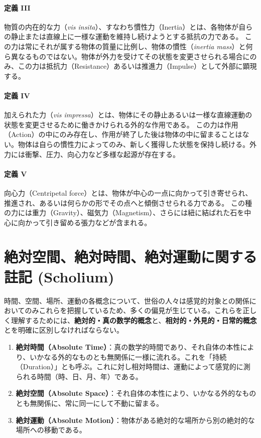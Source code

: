 \documentclass[a4paper,11pt,oneside,openany]{ltjsbook}
\begin{document}
\paragraph{定義 III}
物質の内在的な力（\textit{vis insita}）、すなわち慣性力（Inertia）とは、各物体が自らの静止または直線上に一様な運動を維持し続けようとする抵抗の力である。
この力は常にそれが属する物体の質量に比例し、物体の慣性（\textit{inertia mass}）と何ら異なるものではない。物体が外力を受けてその状態を変更させられる場合にのみ、この力は抵抗力（Resistance）あるいは推進力（Impulse）として外部に顕現する。

\paragraph{定義 IV}
加えられた力（\textit{vis impressa}）とは、物体にその静止あるいは一様な直線運動の状態を変更させるために働きかけられる外的な作用である。
この力は作用（Action）の中にのみ存在し、作用が終了した後は物体の中に留まることはない。物体は自らの慣性力によってのみ、新しく獲得した状態を保持し続ける。外力には衝撃、圧力、向心力など多様な起源が存在する。

\paragraph{定義 V}
向心力（Centripetal force）とは、物体が中心の一点に向かって引き寄せられ、推進され、あるいは何らかの形でその点へと傾倒させられる力である。
この種の力には重力（Gravity）、磁気力（Magnetism）、さらには紐に結ばれた石を中心に向かって引き留める張力などが含まれる。

\section{絶対空間、絶対時間、絶対運動に関する註記 (Scholium)}

時間、空間、場所、運動の各概念について、世俗の人々は感覚的対象との関係においてのみこれらを把握しているため、多くの偏見が生じている。これらを正しく理解するためには、\textbf{絶対的・真の数学的概念}と、\textbf{相対的・外見的・日常的概念}とを明確に区別しなければならない。

\begin{enumerate}
    \item \textbf{絶対時間（Absolute Time）}：真の数学的時間であり、それ自体の本性により、いかなる外的なものとも無関係に一様に流れる。これを「持続（Duration）」とも呼ぶ。これに対し相対時間は、運動によって感覚的に測られる時間（時、日、月、年）である。
    \item \textbf{絶対空間（Absolute Space）}：それ自体の本性により、いかなる外的なものとも無関係に、常に同一にして不動に留まる。
    \item \textbf{絶対運動（Absolute Motion）}：物体がある絶対的な場所から別の絶対的な場所への移動である。
\end{enumerate}
\end{document}
